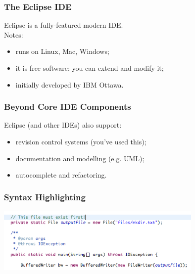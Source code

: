 \begin{frame}
\frametitle{The Eclipse IDE}

\begin{changemargin}{1cm}
\large
Eclipse is a fully-featured modern IDE.\\[1em]

Notes:
\begin{itemize}
\item runs on Linux, Mac, Windows;
\item it is free software: you can extend and modify it;
\item initially developed by IBM Ottawa.
\end{itemize}


\end{changemargin}
\end{frame}

\begin{frame}
\frametitle{Beyond Core IDE Components}

\begin{changemargin}{1cm}
\large
Eclipse (and other IDEs) also support:

\begin{itemize}
\item revision control systems (you've used this); 
\item documentation and modelling (e.g. UML);
\item autocomplete and refactoring.
\end{itemize}

\end{changemargin}
\end{frame}

\begin{frame}
\frametitle{Syntax Highlighting}
\begin{changemargin}{1cm}

\begin{center}
\includegraphics[width=0.75\textwidth]{images/highlight.png}
\end{center}


\end{changemargin}
\end{frame}


